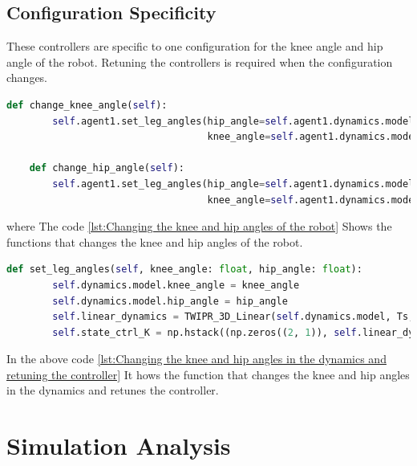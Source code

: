 \subsection{Configuration Specificity}
These controllers are specific to one configuration for the knee angle and hip angle of the robot.
Retuning the controllers is required when the configuration changes.
\begin{lstlisting}[language=Python, caption=Changing the knee and hip angles of the robot, label={lst:Changing the knee and hip angles of the robot}]
    def change_knee_angle(self):
        self.agent1.set_leg_angles(hip_angle=self.agent1.dynamics.model.hip_angle,
                                   knee_angle=self.agent1.dynamics.model.knee_angle + deg2rad(5))

    def change_hip_angle(self):
        self.agent1.set_leg_angles(hip_angle=self.agent1.dynamics.model.hip_angle + deg2rad(5),
                                   knee_angle=self.agent1.dynamics.model.knee_angle)
\end{lstlisting}
where The code \ref{lst:Changing the knee and hip angles of the robot} Shows the functions that changes the knee and hip angles of the robot.
\begin{lstlisting}[language=Python, caption=Changing the knee and hip angles in the dynamics and retuning the controller, label={lst:Changing the knee and hip angles in the dynamics and retuning the controller}]
    def set_leg_angles(self, knee_angle: float, hip_angle: float):
        self.dynamics.model.knee_angle = knee_angle
        self.dynamics.model.hip_angle = hip_angle
        self.linear_dynamics = TWIPR_3D_Linear(self.dynamics.model, Ts, self.poles, self.eigenvectors)
        self.state_ctrl_K = np.hstack((np.zeros((2, 1)), self.linear_dynamics.K))
\end{lstlisting}
In the above code \ref{lst:Changing the knee and hip angles in the dynamics and retuning the controller} It hows the function that changes the knee and hip angles in the dynamics and retunes the controller.


\section{Simulation Analysis}

